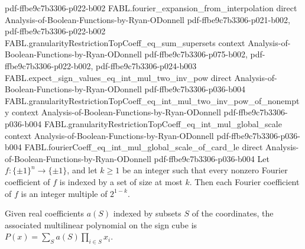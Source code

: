 \begin{theorem}
{    pdf-ffbe9c7b3306-p022-b002}
\proofstep
  {FABL.fourier_expansion_from_interpolation}
  {direct}
  {Analysis-of-Boolean-Functions-by-Ryan-ODonnell}
  {pdf-ffbe9c7b3306-p021-b002,
    pdf-ffbe9c7b3306-p022-b002}
\proofstep
  {FABL.granularityRestrictionTopCoeff_eq_sum_supersets}
  {context}
  {Analysis-of-Boolean-Functions-by-Ryan-ODonnell}
  {pdf-ffbe9c7b3306-p075-b002,
    pdf-ffbe9c7b3306-p022-b002,
    pdf-ffbe9c7b3306-p024-b003}
\proofstep
  {FABL.expect_sign_values_eq_int_mul_two_inv_pow}
  {direct}
  {Analysis-of-Boolean-Functions-by-Ryan-ODonnell}
  {pdf-ffbe9c7b3306-p036-b004}
\proofstep
  {FABL.granularityRestrictionTopCoeff_eq_int_mul_two_inv_pow_of_nonempty}
  {context}
  {Analysis-of-Boolean-Functions-by-Ryan-ODonnell}
  {pdf-ffbe9c7b3306-p036-b004}
\proofstep
  {FABL.granularityRestrictionTopCoeff_eq_int_mul_global_scale}
  {context}
  {Analysis-of-Boolean-Functions-by-Ryan-ODonnell}
  {pdf-ffbe9c7b3306-p036-b004}
\proofstep
  {FABL.fourierCoeff_eq_int_mul_global_scale_of_card_le}
  {direct}
  {Analysis-of-Boolean-Functions-by-Ryan-ODonnell}
  {pdf-ffbe9c7b3306-p036-b004}
Let $f:\{\pm1\}^n\to\{\pm1\}$, and let $k\ge 1$ be an integer such that every nonzero
Fourier coefficient of $f$ is indexed by a set of size at most $k$. Then each Fourier
coefficient of $f$ is an integer multiple of $2^{1-k}$.
\end{theorem}

\begin{definition}
\label{FABL.multilinearPolynomial}
\leanok
{}
Given real coefficients $a(S)$ indexed by subsets $S$ of the coordinates, the associated
multilinear polynomial on the sign cube is $P(x)=\sum_S a(S)\prod_{i\in S}x_i$.
\end{definition}

